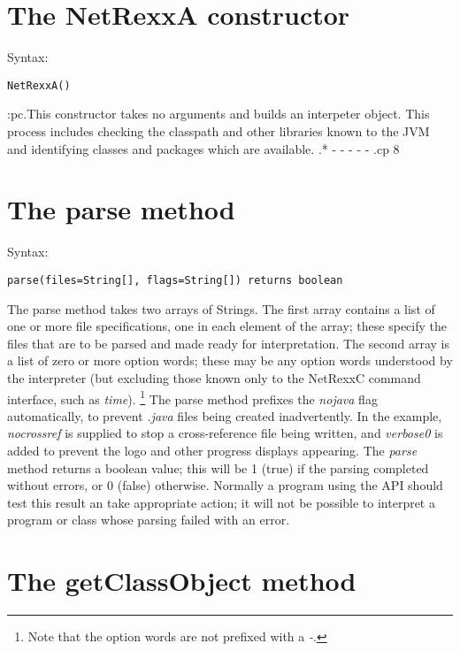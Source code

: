 \section{The NetRexxA constructor}
Syntax:
\begin{verbatim}
NetRexxA()
\end{verbatim}
:pc.This constructor takes no arguments and builds an interpeter object.
This process includes checking the classpath and other libraries known
to the JVM and identifying classes and packages which are available.
.* - - - - -
.cp 8
\section{The parse method}
Syntax:
\begin{verbatim}
parse(files=String[], flags=String[]) returns boolean
\end{verbatim}

The parse method takes two arrays of Strings.  The first array contains
a list of one or more file specifications, one in each element of the
array; these specify the files that are to be parsed and made ready for
interpretation.
\newline
The second array is a list of zero or more option words; these may be
any option words understood by the interpreter (but excluding those
known only to the NetRexxC command interface, such as \emph{time}).
\footnote{Note that the option words are not prefixed with a \emph{-}.}
The parse method prefixes the \emph{nojava} flag automatically, to
prevent \emph{.java} files being created inadvertently.  In the
example, \emph{nocrossref} is supplied to stop a cross-reference file
being written, and \emph{verbose0} is added to prevent the logo and
other progress displays appearing.
\newline
The \emph{parse} method returns a boolean value; this will be 1 (true)
if the parsing completed without errors, or 0 (false) otherwise.
Normally a program using the API should test this result an take
appropriate action; it will not be possible to interpret a program or
class whose parsing failed with an error.

\section{The getClassObject method}

